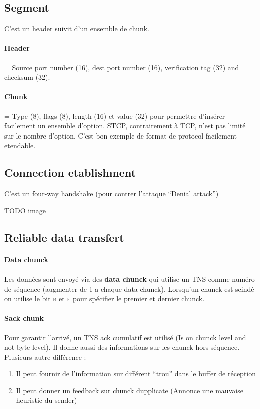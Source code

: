 \documentclass{report}
\begin{document}
\subsection{Segment}
C'est un header suivit d'un ensemble de chunk.

\paragraph{Header} = Source port number (16), dest port number (16), verification tag (32) and checksum (32).

\paragraph{Chunk} = Type (8), flags (8), length (16) et value (32) pour permettre d'insérer facilement un ensemble d'option. STCP, contrairement à TCP, n'est pas limité sur le nombre d'option. C'est bon exemple de format de protocol facilement etendable.

\subsection{Connection etablishment}
C'est un four-way handshake (pour contrer l'attaque ``Denial attack'')

TODO image

\subsection{Reliable data transfert}

\paragraph{Data chunck}
Les données sont envoyé via des \textbf{data chunck} qui utilise un TNS comme 
numéro de séquence (augmenter de 1 a chaque data chunck). Lorsqu'un chunck est
scindé on utilise le bit \textsc{b} et \textsc{e} pour spécifier le premier et dernier
chunck.

\paragraph{Sack chunk}
Pour garantir l'arrivé, un TNS ack cumulatif est utilisé (Is on chunck level and not 
byte level). Il donne aussi des informations sur les chunck hors séquence.
Plusieurs autre différence :
\begin{enumerate}
    \item Il peut fournir de l'information sur différent ``trou'' dans le buffer de réception
    \item Il peut donner un feedback sur chunck dupplicate (Annonce une mauvaise heuristic du sender)
\end{enumerate}
\end{document}
